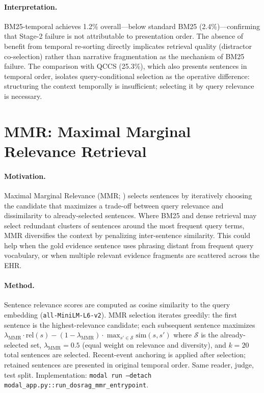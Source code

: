 \documentclass{article}
\begin{document}
\paragraph{Interpretation.}
BM25-temporal achieves 1.2\% overall---below standard BM25 (2.4\%)---confirming
that Stage-2 failure is not attributable to presentation order. The absence of
benefit from temporal re-sorting directly implicates retrieval quality (distractor
co-selection) rather than narrative fragmentation as the mechanism of BM25 failure.
The comparison with QCCS (25.3\%), which also presents sentences in temporal order,
isolates query-conditional selection as the operative difference: structuring the
context temporally is insufficient; selecting it by query relevance is necessary.



\section{MMR: Maximal Marginal Relevance Retrieval}
\label{app:mmr}

\paragraph{Motivation.}
Maximal Marginal Relevance (MMR; \citealt{carbonell1998mmr}) selects sentences
by iteratively choosing the candidate that maximizes a trade-off between
query relevance and dissimilarity to already-selected sentences.
Where BM25 and dense retrieval may select redundant clusters of sentences around
the most frequent query terms, MMR diversifies the context by penalizing
inter-sentence similarity. This could help when the gold evidence sentence uses
phrasing distant from frequent query vocabulary, or when multiple relevant
evidence fragments are scattered across the EHR.

\paragraph{Method.}
Sentence relevance scores are computed as cosine similarity to the query
embedding (\texttt{all-MiniLM-L6-v2}). MMR selection iterates greedily:
the first sentence is the highest-relevance candidate; each subsequent
sentence maximizes $\lambda_{\mathrm{MMR}} \cdot \mathrm{rel}(s) -
(1-\lambda_{\mathrm{MMR}}) \cdot \max_{s' \in \mathcal{S}} \mathrm{sim}(s, s')$
where $\mathcal{S}$ is the already-selected set, $\lambda_{\mathrm{MMR}} = 0.5$
(equal weight on relevance and diversity), and $k{=}20$ total sentences are
selected. Recent-event anchoring is applied after selection; retained sentences
are presented in original temporal order. Same reader, judge, test split.
Implementation: \texttt{modal run --detach modal\_app.py::run\_dosrag\_mmr\_entrypoint}.
\end{document}
